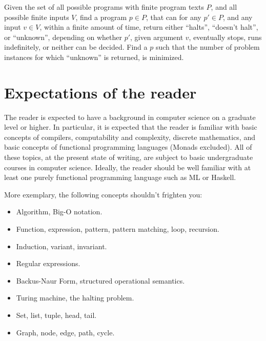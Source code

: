 \begin{definition} Given the set of all possible programs with finite program
texts $P$, and all possible finite inputs $V$, find a program $p\in P$, that
can for any $p'\in P$, and any input $v\in V$, within a finite amount of time,
return either ``halts'', ``doesn't halt'', or ``unknown'', depending on whether
$p'$, given argument $v$, eventually stops, runs indefinitely, or neither can
be decided. Find a $p$ such that the number of problem instances for which
``unknown'' is returned, is minimized.\end{definition}

\section{Expectations of the reader}

The reader is expected to have a background in computer science on a graduate
level or higher. In particular, it is expected that the reader is familiar with
basic concepts of compilers, computability and complexity, discrete
mathematics, and basic concepts of functional programming languages (Monads
excluded). All of these topics, at the present state of writing, are subject to
basic undergraduate courses in computer science. Ideally, the reader should be
well familiar with at least one purely functional programming language such as
ML or Haskell.

More exemplary, the following concepts shouldn't frighten you:

\begin{itemize}

\item Algorithm, Big-O notation.

\item Function, expression, pattern, pattern matching, loop, recursion.

\item Induction, variant, invariant.

\item Regular expressions.

\item Backus-Naur Form, structured operational semantics.

\item Turing machine, the halting problem.

\item Set, list, tuple, head, tail.

\item Graph, node, edge, path, cycle.

\end{itemize}

